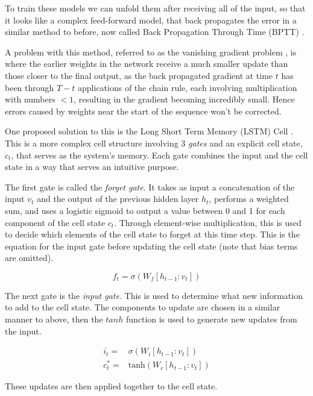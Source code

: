 \documentclass[bsc,singlespacing,logo, parskip, deptreport]{infthesis}
\begin{document}
To train these models we can unfold them after receiving all of the input, so that it looks like a complex feed-forward model, that back propagates the error in a similar method to before, now called Back Propagation Through Time (BPTT) \cite{werbos1990backpropagation}.

A problem with this method, referred to as the vanishing gradient problem \cite{hochreiter1998vanishing}, is where the earlier weights in the network receive a much smaller update than those closer to the final output, as the back propagated gradient at time $t$ has been through $T - t$ applications of the chain rule, each involving multiplication with numbers $< 1$, resulting in the gradient becoming incredibly small. Hence errors caused by weights near the start of the sequence won't be corrected.

One proposed solution to this is the Long Short Term Memory (LSTM) Cell \cite{hochreiter1997long}. This is a more complex cell structure involving 3 {\em gates} and an explicit cell state, $c_t$, that serves as the system's memory. Each gate combines the input and the cell state in a way that serves an intuitive purpose.

The first gate is called the {\em forget gate}. It takes as input a concatenation of the input $v_t$ and the output of the previous hidden layer $h_t$, performs a weighted sum, and uses a logistic sigmoid to output a value between 0 and 1 for each component of the cell state $c_t$. Through element-wise multiplication, this is used to decide which elements of the cell state to forget at this time step. This is the equation for the input gate before updating the cell state (note that bias terms are omitted).

\begin{equation}
  \label{forget gate}
  f_t = \sigma (W_f [h_{t-1} : v_t])
\end{equation}

The next gate is the {\em input gate}. This is used to determine what new information to add to the cell state. The components to update are chosen in a similar manner to above, then the $tanh$ function is used to generate new updates from the input.

\begin{align}
  \label{input gate}
  i_t =& \sigma (W_i [h_{t-1} : v_t]) \\
  c^*_t =& \mathrm{tanh} (W_c [h_{t-1} : v_t])
\end{align}

These updates are then applied together to the cell state.
\end{document}
